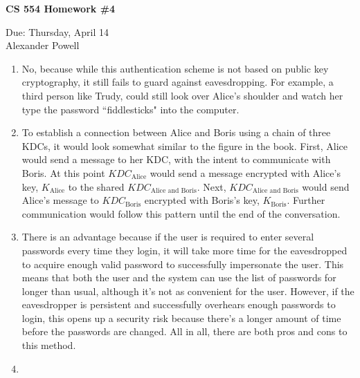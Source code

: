 \documentclass[11pt]{article}
\begin{document}
\begin{center}             %
\begin{LARGE}
{\bf CS 554 Homework \#4}
\end{LARGE}
\vskip 0.25cm      %

Due: Thursday, April 14\\  %
Alexander Powell
\end{center}

\begin{enumerate}

\item 

No, because while this authentication scheme is not based on public key cryptography, it still fails to guard against eavesdropping.  For example, a third person like Trudy, could still look over Alice's shoulder and watch her type the password ``fiddlesticks" into the computer.  

\item 

To establish a connection between Alice and Boris using a chain of three KDCs, it would look somewhat similar to the figure in the book.  First, Alice would send a message to her KDC, with the intent to communicate with Boris.  At this point $KDC_{\text{Alice}}$ would send a message encrypted with Alice's key, $K_{\text{Alice}}$ to the shared $KDC_{\text{Alice and Boris}}$.  Next, $KDC_{\text{Alice and Boris}}$ would send Alice's message to $KDC_{\text{Boris}}$ encrypted with Boris's key, $K_{\text{Boris}}$.  Further communication would follow this pattern until the end of the conversation.  

\item 

There is an advantage because if the user is required to enter several passwords every time they login, it will take more time for the eavesdropped to acquire enough valid password to successfully impersonate the user.  This means that both the user and the system can use the list of passwords for longer than usual, although it's not as convenient for the user.  However, if the eavesdropper is persistent and successfully overhears enough passwords to login, this opens up a security risk because there's a longer amount of time before the passwords are changed.  All in all, there are both pros and cons to this method.  

\item 


\end{enumerate}
\end{document}

